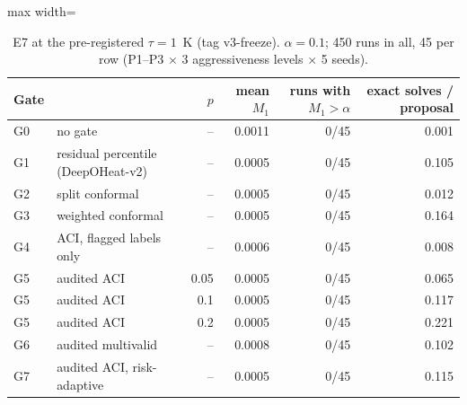 \begin{table}[t]\centering\small
\begin{adjustbox}{max width=\linewidth}\begin{tabular}{llrrrr}
\hline
Gate & & $p$ & mean $M_1$ & runs with $M_1>\alpha$ & exact solves / proposal \\
\hline
G0 & no gate & -- & 0.0011 & 0/45 & 0.001 \\
G1 & residual percentile (DeepOHeat-v2) & -- & 0.0005 & 0/45 & 0.105 \\
G2 & split conformal & -- & 0.0005 & 0/45 & 0.012 \\
G3 & weighted conformal & -- & 0.0005 & 0/45 & 0.164 \\
G4 & ACI, flagged labels only & -- & 0.0006 & 0/45 & 0.008 \\
G5 & audited ACI & 0.05 & 0.0005 & 0/45 & 0.065 \\
G5 & audited ACI & 0.1 & 0.0005 & 0/45 & 0.117 \\
G5 & audited ACI & 0.2 & 0.0005 & 0/45 & 0.221 \\
G6 & audited multivalid & -- & 0.0008 & 0/45 & 0.102 \\
G7 & audited ACI, risk-adaptive & -- & 0.0005 & 0/45 & 0.115 \\
\hline
\end{tabular}\end{adjustbox}
\caption{E7 at the pre-registered $\tau = 1$~K (tag v3-freeze). $\alpha = 0.1$; 450 runs in all, 45 per row (P1--P3 $\times$ 3 aggressiveness levels $\times$ 5 seeds).}
\label{tab:e7-tau1}
\end{table}
